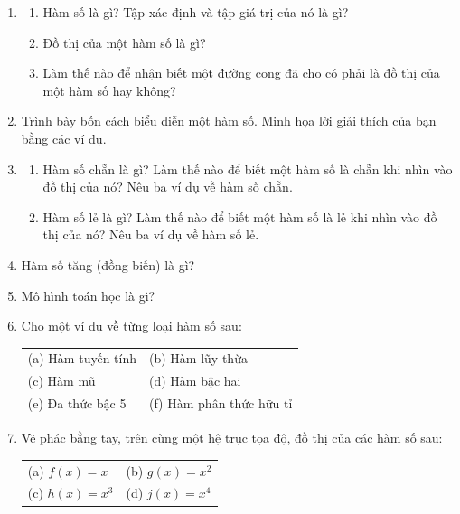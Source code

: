 \noindent
\begin{minipage}[t]{0.485\textwidth}
\fontsize{8.5}{10.8}\selectfont
\begin{enumerate}[label=\textbf{\arabic*.}, leftmargin=1.4em, itemsep=3.5pt, topsep=1pt, parsep=0pt]
    \item 
    \begin{enumerate}[label=\textsf{(\alph*)}, leftmargin=1.3em, itemsep=1.5pt, topsep=1pt]
        \item Hàm số là gì? Tập xác định và tập giá trị của nó là gì?
        \item Đồ thị của một hàm số là gì?
        \item Làm thế nào để nhận biết một đường cong đã cho có phải là đồ thị của một hàm số hay không?
    \end{enumerate}

    \item Trình bày bốn cách biểu diễn một hàm số. Minh họa lời giải thích của bạn bằng các ví dụ.

    \item 
    \begin{enumerate}[label=\textsf{(\alph*)}, leftmargin=1.3em, itemsep=1.5pt, topsep=1pt]
        \item Hàm số chẵn là gì? Làm thế nào để biết một hàm số là chẵn khi nhìn vào đồ thị của nó? Nêu ba ví dụ về hàm số chẵn.
        \item Hàm số lẻ là gì? Làm thế nào để biết một hàm số là lẻ khi nhìn vào đồ thị của nó? Nêu ba ví dụ về hàm số lẻ.
    \end{enumerate}

    \item Hàm số tăng (đồng biến) là gì?

    \item Mô hình toán học là gì?

    \item Cho một ví dụ về từng loại hàm số sau:\\[2pt]
    \begin{tabular}{@{}ll@{}}
    \textsf{(a)} Hàm tuyến tính & \textsf{(b)} Hàm lũy thừa \\
    \textsf{(c)} Hàm mũ & \textsf{(d)} Hàm bậc hai \\
    \textsf{(e)} Đa thức bậc 5 & \textsf{(f)} Hàm phân thức hữu tỉ
    \end{tabular}

    \item Vẽ phác bằng tay, trên cùng một hệ trục tọa độ, đồ thị của các hàm số sau:\\[2pt]
    \begin{tabular}{@{}ll@{}}
    \textsf{(a)} $f(x) = x$ & \textsf{(b)} $g(x) = x^2$ \\
    \textsf{(c)} $h(x) = x^3$ & \textsf{(d)} $j(x) = x^4$
    \end{tabular}


\end{enumerate}
\end{minipage}
